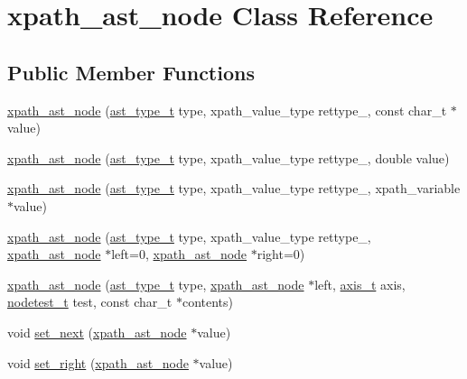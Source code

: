 \hypertarget{classxpath__ast__node}{
\section{xpath\_\-ast\_\-node Class Reference}
\label{classxpath__ast__node}
}
\subsection*{Public Member Functions}
\begin{DoxyCompactItemize}
\item 
\hyperlink{classxpath__ast__node_af155d17a4477a693d37f4e34957dcc21}{xpath\_\-ast\_\-node} (\hyperlink{pugixml_8cpp_a11258a240266b84b6b0526930e5d330d}{ast\_\-type\_\-t} type, xpath\_\-value\_\-type rettype\_\-, const char\_\-t $\ast$value)
\item 
\hyperlink{classxpath__ast__node_ada97458f3fc7d6c87cf70d8084117b0d}{xpath\_\-ast\_\-node} (\hyperlink{pugixml_8cpp_a11258a240266b84b6b0526930e5d330d}{ast\_\-type\_\-t} type, xpath\_\-value\_\-type rettype\_\-, double value)
\item 
\hyperlink{classxpath__ast__node_a8de4244f7b9fc7626049197ddc0afab7}{xpath\_\-ast\_\-node} (\hyperlink{pugixml_8cpp_a11258a240266b84b6b0526930e5d330d}{ast\_\-type\_\-t} type, xpath\_\-value\_\-type rettype\_\-, xpath\_\-variable $\ast$value)
\item 
\hyperlink{classxpath__ast__node_af6f4ffea3f3c7fdb6ef1e759d4b070f4}{xpath\_\-ast\_\-node} (\hyperlink{pugixml_8cpp_a11258a240266b84b6b0526930e5d330d}{ast\_\-type\_\-t} type, xpath\_\-value\_\-type rettype\_\-, \hyperlink{classxpath__ast__node}{xpath\_\-ast\_\-node} $\ast$left=0, \hyperlink{classxpath__ast__node}{xpath\_\-ast\_\-node} $\ast$right=0)
\item 
\hyperlink{classxpath__ast__node_a7cf74b277deba86a6575796c727fe458}{xpath\_\-ast\_\-node} (\hyperlink{pugixml_8cpp_a11258a240266b84b6b0526930e5d330d}{ast\_\-type\_\-t} type, \hyperlink{classxpath__ast__node}{xpath\_\-ast\_\-node} $\ast$left, \hyperlink{pugixml_8cpp_ae7747145441b0591a5c04f20f6f9189a}{axis\_\-t} axis, \hyperlink{pugixml_8cpp_ab268b4264276130baeb17ab629015275}{nodetest\_\-t} test, const char\_\-t $\ast$contents)
\item 
void \hyperlink{classxpath__ast__node_a2764184d076834284eb3ff3182b845cc}{set\_\-next} (\hyperlink{classxpath__ast__node}{xpath\_\-ast\_\-node} $\ast$value)
\item 
void \hyperlink{classxpath__ast__node_afe044146db852b7d4dbf188fd2ff6c75}{set\_\-right} (\hyperlink{classxpath__ast__node}{xpath\_\-ast\_\-node} $\ast$value)

\end{DoxyCompactItemize}
